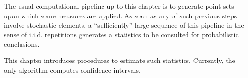 %
The usual computational pipeline up to this chapter is to generate point sets upon which some measures are applied. As soon as any of such previous steps involve stochastic elements, a \enquote{sufficiently} large sequence of this pipeline in the sense of i.i.d. repetitions generates a statistics to be consulted for probabilistic conclusions.

This chapter introduces procedures to estimate such statistics. Currently, the only algorithm computes confidence intervals.

\clearpage
